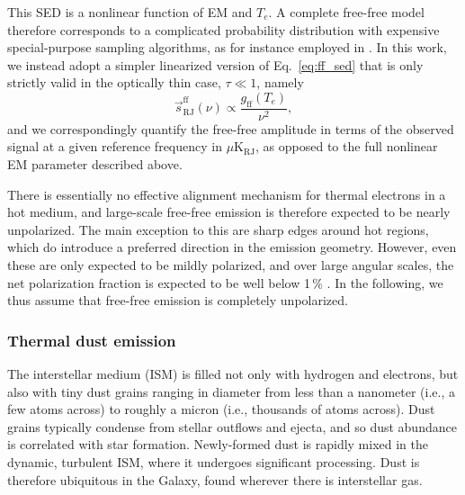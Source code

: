 \documentclass[twocolumn]{aa}
\newcommand{\s}[0]{\vec{s}}
\begin{document}
This SED is a nonlinear function of EM and $T_{e}$. A complete
free-free model therefore corresponds to a complicated probability
distribution with expensive special-purpose sampling algorithms, as
for instance employed in \citet{planck2014-a11}. In this work, we
instead adopt a simpler linearized version of Eq.~\eqref{eq:ff_sed} that
is only strictly valid in the optically thin case, $\tau \ll 1$, namely
\begin{equation}
  \s^{\mathrm{ff}}_{\mathrm{RJ}}(\nu) \propto\frac{g_{\mathrm{ff}}(T_e)}{\nu^2},
  \label{eq:ff_sed_linear}
\end{equation}
and we correspondingly quantify the free-free amplitude in terms of
the observed signal at a given reference frequency in
$\mu\mathrm{K}_{\mathrm{RJ}}$, as opposed to the full nonlinear EM
parameter described above.

There is essentially no effective alignment mechanism for thermal
electrons in a hot medium, and large-scale free-free emission is
therefore expected to be nearly unpolarized. The main exception to
this are sharp edges around hot  regions, which do
introduce a preferred direction in the emission geometry. However,
even these are only expected to be mildly polarized, and over large
angular scales, the net polarization fraction is expected to be well
below 1\,\% \citep[see discussion in][]{keating1998}. In the
following, we thus assume that free-free emission is completely
unpolarized.

\subsubsection{Thermal dust emission}
\label{sec:dust}

The interstellar medium (ISM) is filled not only with hydrogen and
electrons, but also with tiny dust grains ranging in diameter from less 
than a nanometer (i.e., a few atoms across) to roughly a micron (i.e.,
thousands of atoms across). Dust grains typically condense
from stellar outflows and ejecta, and so dust abundance is correlated
with star formation. Newly-formed dust is rapidly mixed in the dynamic,
turbulent ISM, where it undergoes significant processing. Dust is
therefore ubiquitous in the Galaxy, found wherever there is interstellar
gas. 
\end{document}
